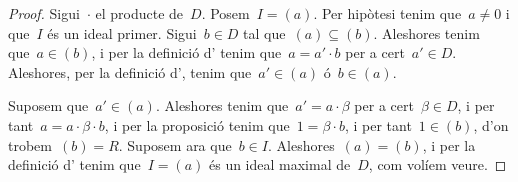 \documentclass[../../main.tex]{subfiles}
\begin{document}
    \begin{proof}
        Sigui~\(\cdot\) el producte de~\(D\).
        Posem~\(I=(a)\).
        Per hipòtesi tenim que~\(a\neq0\) i que~\(I\) és un ideal primer.
        Sigui~\(b\in D\) tal que~\((a)\subseteq(b)\).
        Aleshores tenim que~\(a\in(b)\), i per la definició d' tenim que~\(a=a'\cdot b\) per a cert~\(a'\in D\).
        Aleshores, per la definició d', tenim que~\(a'\in(a)\) ó~\(b\in(a)\).

        Suposem que~\(a'\in(a)\).
        Aleshores tenim que~\(a'=a\cdot\beta\) per a cert~\(\beta\in D\), i per tant~\(a=a\cdot\beta\cdot b\), i per la proposició  tenim que~\(1=\beta\cdot b\), i per tant~\(1\in(b)\), d'on trobem~\((b)=R\).
        Suposem ara que~\(b\in I\).
        Aleshores~\((a)=(b)\), i per la definició d' tenim que~\(I=(a)\) és un ideal maximal de~\(D\), com volíem veure.
    \end{proof}
\end{document}
